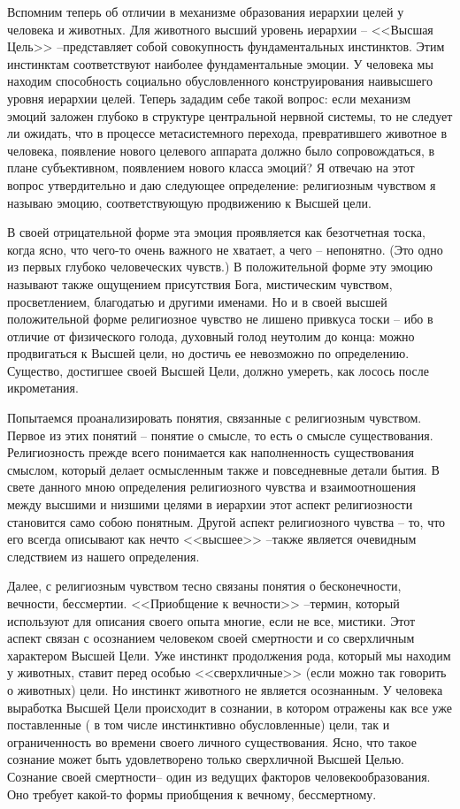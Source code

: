 \documentclass{book}
\begin{document}
Вспомним теперь об отличии в механизме образования иерархии целей у человека и животных. Для животного высший уро­вень иерархии -- <<Высшая Цель>> --представляет собой совокуп­ность фундаментальных инстинктов. Этим инстинктам соот­ветствуют наиболее фундаментальные эмоции. У человека мы находим способность социально обусловленного конструиро­вания наивысшего уровня иерархии целей. Теперь зададим се­бе такой вопрос: если механизм эмоций заложен глубоко в структуре центральной нервной системы, то не следует ли ожи­дать, что в процессе метасистемного перехода, превратившего животное в человека, появление нового целевого аппарата должно было сопровождаться, в плане субъективном, появле­нием нового класса эмоций?
Я отвечаю на этот вопрос утвердительно и даю следующее определение: религиозным чувством я называю эмоцию, соот­ветствующую продвижению к Высшей цели.

В своей отрицательной форме эта эмоция проявляется как безотчетная тоска, когда ясно, что чего-то очень важного не хва­тает, а чего -- непонятно. (Это одно из первых глубоко челове­ческих чувств.) В положительной форме эту эмоцию называют также ощущением присутствия Бога, мистическим чувством, просветлением, благодатью и другими именами. Но и в своей высшей положительной форме религиозное чувство не лишено привкуса тоски -- ибо в отличие от физического голода, духов­ный голод неутолим до конца: можно продвигаться к Высшей цели, но достичь ее невозможно по определению. Существо, достигшее своей Высшей Цели, должно умереть, как лосось пос­ле икрометания.

Попытаемся проанализировать понятия, связанные с рели­гиозным чувством. Первое из этих понятий -- понятие о смысле, то есть о смысле существования. Религиозность прежде всего понимается как наполненность существования смыслом, кото­рый делает осмысленным также и повседневные детали бытия. В свете данного мною определения религиозного чувства и взаимоотношения между высшими и низшими целями в иерар­хии этот аспект религиозности становится само собою понят­ным. Другой аспект религиозного чувства -- то, что его всегда описывают как нечто <<высшее>> --также является очевидным следствием из нашего определения.

Далее, с религиозным чувством тесно связаны понятия о бесконечности, вечности, бессмертии. <<Приобщение к вечности>> --термин, который используют для описания своего опы­та многие, если не все, мистики. Этот аспект связан с осозна­нием человеком своей смертности и со сверхличным  характе­ром Высшей Цели. Уже инстинкт продолжения рода, который мы находим у животных, ставит перед особью <<сверхличные>> (если можно так говорить о животных) цели. Но инстинкт жи­вотного не является осознанным. У человека выработка Выс­шей Цели происходит в сознании, в котором отражены как все уже поставленные ( в том числе инстинктивно обусловленные) цели, так и ограниченность во времени своего личного сущест­вования. Ясно, что такое сознание может быть удовлетворено только сверхличной Высшей Целью. Сознание своей смертно­сти-- один из ведущих факторов человекообразования. Оно тре­бует какой-то формы приобщения к вечному, бессмертному.
\end{document}

